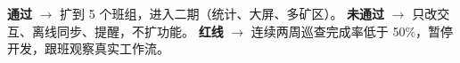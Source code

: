 \documentclass[11pt,a4paper,twoside,fontset=fandol]{ctexart}
\begin{document}
\begin{tcolorbox}[colback=black!2,colframe=black!35,boxrule=0.4pt,arc=0pt,left=6pt,right=6pt,top=4pt,bottom=4pt]
\small
\textbf{通过} $\rightarrow$ 扩到 5 个班组，进入二期（统计、大屏、多矿区）。\quad
\textbf{未通过} $\rightarrow$ 只改交互、离线同步、提醒，不扩功能。\quad
\textbf{红线} $\rightarrow$ 连续两周巡查完成率低于 50\%，暂停开发，跟班观察真实工作流。
\end{tcolorbox}
\end{document}
